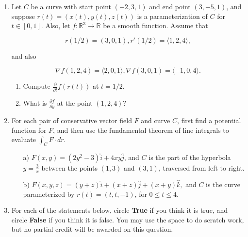 \documentclass[12 pt]{report}
\begin{document}
\newpage
\begin{enumerate} \item Let $C$ be a curve with start point $(-2,3,1)$ and end point $(3, -5, 1)$, and suppose $r(t) = (x(t), y(t), z(t))$ is a parameterization of $C$ for $t \in [0,1]$. Also, let $f: \mathbb{R}^3 \to \mathbb{R}$ be a smooth function. Assume that 

$$r(1/2) = (3,0,1), r'(1/2) = \langle 1,2,4 \rangle,$$ 

and also 

$$\nabla f(1,2,4) = \langle 2, 0, 1\rangle, \nabla f(3,0,1) = \langle -1, 0, 4 \rangle.$$ 

\begin{enumerate} \item Compute $\frac{\partial}{\partial t} f(r(t))$ at $t = 1/2$. 

\vfill 

\item What is $\frac{\partial f}{\partial y}$ at the point $(1,2,4)$?

\vfill

\end{enumerate}

\newpage

\item For each pair of conservative vector field $F$ and curve $C$, first find a potential function for $F$, and then use the fundamental theorem of line integrals to evaluate $\int_C F \cdot dr$. 

\begin{enumerate} \item[a)] $F(x,y) = (2y^2-3) \hat{i} + 4xy \hat{j}$, and $C$ is the part of the hyperbola $y = \frac{3}{x}$ between the points $(1,3)$ and $(3,1)$, traversed from left to right. 

\vfill

\item[b)] $F(x,y,z) = (y+z)\hat{i} + (x+z)\hat{j} + (x+y)\hat{k} ,$ and $C$ is the curve parameterized by $r(t) = (t, t, -1)$, for $0 \leq t \leq 4$. 

\vfill

\end{enumerate}

\newpage


\item For each of the statements below, circle \textbf{True} if you think it is true, and circle \textbf{False} if you think it is false. You may use the space to do scratch work, but no partial credit will be awarded on this question. 


\end{enumerate}
\end{document}
